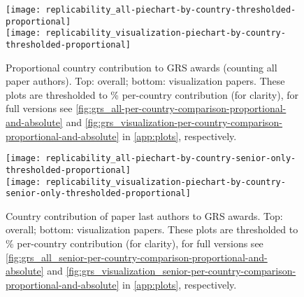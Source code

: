 \documentclass[conference]{vgtc}                     %
\begin{document}
\begin{figure}
	\centering
	\texttt{[image: replicability\_all-piechart-by-country-thresholded-proportional]}\\[1ex]%
	\texttt{[image: replicability\_visualization-piechart-by-country-thresholded-proportional]}%
	\caption{Proportional country contribution to GRS awards (counting all paper authors). Top: overall; bottom: visualization papers. These plots are thresholded to \GrsiCountryPieChartThreshold\% per-country contribution (for clarity), for full versions see \autoref{fig:grs_all-per-country-comparison-proportional-and-absolute} and \autoref{fig:grs_visualization-per-country-comparison-proportional-and-absolute} in \autoref{app:plots}, respectively.}
	\label{fig:vis-grs-per-country-proportional}
\end{figure}

\begin{figure}
	\centering
	\texttt{[image: replicability\_all-piechart-by-country-senior-only-thresholded-proportional]}\\[1ex]%
	\texttt{[image: replicability\_visualization-piechart-by-country-senior-only-thresholded-proportional]}%
	\caption{Country contribution of paper last authors to GRS awards. Top: overall; bottom: visualization papers. These plots are thresholded to \GrsiCountryPieChartThreshold\% per-country contribution (for clarity), for full versions see \autoref{fig:grs_all_senior-per-country-comparison-proportional-and-absolute} and \autoref{fig:grs_visualization_senior-per-country-comparison-proportional-and-absolute} in \autoref{app:plots}, respectively.}
	\label{fig:vis-grs-per-country-proportional-last-authors}
\end{figure}
\end{document}
